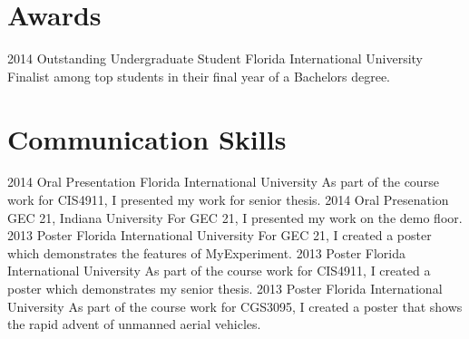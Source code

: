\documentclass[]{friggeri-cv} %
\begin{document}

\section{Awards}
\begin{entrylist}
\entry
{2014}
{Outstanding Undergraduate Student}
{Florida International University}
{Finalist among top students in their final year of a Bachelors degree.}
\end{entrylist}

\clearpage
\section{Communication Skills}
\begin{entrylist}
\entry
{2014}
{Oral Presentation}
{Florida International University}
{As part of the course work for CIS4911, I presented my work for senior thesis.}
\entry
{2014}
{Oral Presenation}
{GEC 21, Indiana University}
{For GEC 21, I presented my work on the demo floor.}
\entry
{2013}
{Poster}
{Florida International University}
{For GEC 21, I created a poster which demonstrates the features of MyExperiment.}
\entry
{2013}
{Poster}
{Florida International University}
{As part of the course work for CIS4911, I created a poster which demonstrates my senior thesis.}
\entry
{2013}
{Poster}
{Florida International University}
{As part of the course work for CGS3095, I created a poster that shows the rapid advent of unmanned aerial vehicles.}
\end{entrylist}

\end{document}
